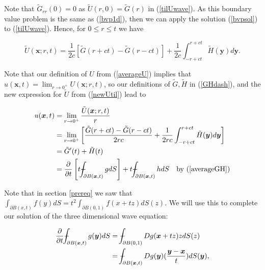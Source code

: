 \documentclass[a4paper, 12pt]{article}
\def\Xint#1{\mathchoice
{\XXint\displaystyle\textstyle{#1}}%
{\XXint\textstyle\scriptstyle{#1}}%
{\XXint\scriptstyle\scriptscriptstyle{#1}}%
{\XXint\scriptscriptstyle\scriptscriptstyle{#1}}%
\!\int}
\def\XXint#1#2#3{{\setbox0=\hbox{$#1{#2#3}{\int}$ }
\vcenter{\hbox{$#2#3$ }}\kern-.6\wd0}}
\def\dashint{\Xint-}
\numberwithin{equation}{section}
\begin{document}
Note that $\tilde{G}_{rr}(0)=0$ as $\tilde{U}(r,0)=\tilde{G}(r)$ in (\ref{tilUwave}). As this boundary value problem is the same as (\ref{bvp1d}), then we can apply 
the solution (\ref{bvpsol}) to (\ref{tilUwave}). Hence, for $0 \le r \le t$ we have 

\begin{equation} \label{newUtil}
    \tilde{U}(\boldsymbol{x};r,t)=\frac{1}{2c}\left[\tilde{G}(r+ct)-\tilde{G}(r-ct)\right]+\frac{1}{2c}\int^{r+ct}_{-r+ct}\tilde{H}(\boldsymbol{y})d\boldsymbol{y}.
\end{equation} 

Note that our definition of $U$ from (\ref{averageU}) implies that $u(\boldsymbol{x},t)=\lim_{r\rightarrow 0^+}U(\boldsymbol{x};r,t)$, so our definitions of $\tilde{G}, \tilde{H}$ in (\ref{GHdash}),
 and the new expression for $\tilde{U}$ from (\ref{newUtil}) lead to

\begin{equation} \label{almostK}
    \begin{aligned}
        u(\boldsymbol{x},t)&=\lim_{r\rightarrow 0^+}\frac{\tilde{U}(\boldsymbol{x};r,t)}{r}\\
        &=\lim_{r\rightarrow 0^+}\left[\frac{\tilde{G}(r+ct)-\tilde{G}(r-ct)}{2rc}+\frac{1}{2rc}\int^{r+ct}_{-r+ct}\tilde{H}(\boldsymbol{y})d\boldsymbol{y}\right]\\
        &=\tilde{G}'(t)+\tilde{H}(t)\\
        &=\diffp[1]{}{t}\left[t\dashint_{\partial B(\boldsymbol{x},t)}{gdS} \right]+t\dashint_{\partial B(\boldsymbol{x},t)}{hdS} \quad \textrm{by (\ref{averageGH})}
    \end{aligned}
\end{equation}

Note that in section \ref{prereq} we saw that $\int_{\partial B(x,t)}f(y)dS=t^2\int_{\partial B(0,1)} f(x+tz)dS(z)$. We will use this to complete our solution of the
three dimensional wave equation:

\begin{equation*}
    \begin{aligned}
    \diffp[1]{}{t}\dashint_{\partial B(\boldsymbol{x},t)} {g(\boldsymbol{y})dS} &= \dashint_{\partial B(0,1)} {Dg(\boldsymbol{x}+tz)zdS(z)}\\
    &=\dashint_{\partial B(\boldsymbol{x},t)}{Dg(\boldsymbol{y})(\frac{\boldsymbol{y}-\boldsymbol{x}}{t})dS(\boldsymbol{y})},
    \end{aligned}
\end{equation*}
\end{document}

